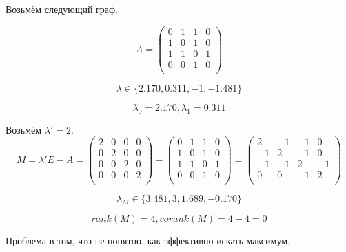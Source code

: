 \begin{example}
Возьмём следующий граф.
\begin{center}
  \end{center}
 
$$ A =
  \left({
  \begin{array}{rrrrrr}
  0 & 1 & 1 & 0 \\
  1 & 0 & 1 & 0 \\
  1 & 1 & 0 & 1 \\
  0 & 0 & 1 & 0 \\
  \end{array}
  }\right)
$$

$$\lambda \in \{2.170,0.311,-1,-1.481\}$$

$$\lambda_0 = 2.170, \lambda_1 = 0.311$$

Возьмём $\lambda' = 2$.
$$
M = \lambda'E - A =
\left({
  \begin{array}{rrrrrr}
  2 & 0 & 0 & 0 \\
  0 & 2 & 0 & 0 \\
  0 & 0 & 2 & 0 \\
  0 & 0 & 0 & 2 \\
  \end{array}
  }\right)
  -
  \left({
  \begin{array}{rrrrrr}
  0 & 1 & 1 & 0 \\
  1 & 0 & 1 & 0 \\
  1 & 1 & 0 & 1 \\
  0 & 0 & 1 & 0 \\
  \end{array}
  }\right)
  =
  \left({
  \begin{array}{rrrrrr}
   2 & -1 & -1 &  0 \\
  -1 &  2 & -1 &  0 \\
  -1 & -1 &  2 & -1 \\
   0 &  0 & -1 &  2 \\
  \end{array}
  }\right)
$$

$$\lambda_M \in \{3.481, 3, 1.689, -0.170\}$$

$$rank(M) = 4, corank(M) = 4 - 4 = 0$$

Проблема в том, что не понятно, как эффективно искать максимум.
\end{example}


